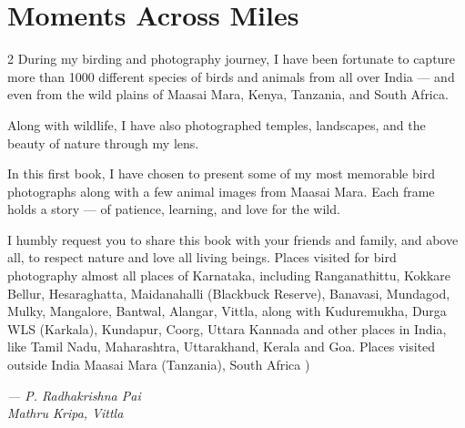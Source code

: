 \documentclass[12pt]{article}
\newcommand{\attribution}[1]{%
  \par\vspace{2em}%
  \begin{flushright}\itshape #1\end{flushright}%
}
\begin{document}
\section*{Moments Across Miles}
\begin{multicols}{2}
\noindent During my birding and photography journey, I have been fortunate to capture more than 1000 different species of birds and animals from all over India — and even from the wild plains of Maasai Mara, Kenya, Tanzania, and South Africa.

Along with wildlife, I have also photographed temples, landscapes, and the beauty of nature through my lens.

In this first book, I have chosen to present some of my most memorable bird photographs along with a few animal images from Maasai Mara. Each frame holds a story — of patience, learning, and love for the wild.

I humbly request you to share this book with your friends and family, and above all, to respect nature and love all living beings. Places visited for bird photography almost all places of Karnataka, including Ranganathittu, Kokkare Bellur, Hesaraghatta, Maidanahalli (Blackbuck Reserve), Banavasi, Mundagod, Mulky, Mangalore, Bantwal, Alangar, Vittla, along with Kuduremukha, Durga WLS (Karkala), Kundapur, Coorg, Uttara Kannada and other places in India, like Tamil Nadu, Maharashtra, Uttarakhand, Kerala and Goa. Places visited outside India Maasai Mara (Tanzania), South Africa )

\end{multicols}
\attribution{— P. Radhakrishna Pai\\Mathru Kripa, Vittla}
\newpage
\end{document}
